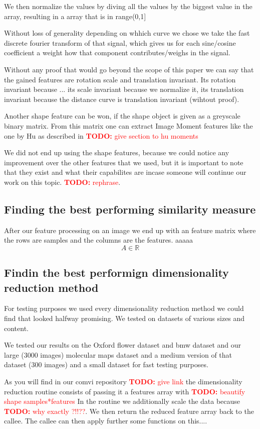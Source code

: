 \documentclass[journal]{vgtc}       %
\newcommand{\todo}[1]{\textcolor{red}{\textbf{TODO:} #1}}
\begin{document}
We then normalize the values by diving all the values by the biggest value in the array, resulting in a array that is in range(0,1]

Without loss of generality depending on whhich curve we chose we take the fast discrete fourier transform of that signal, which gives us for each sine/cosine coefficient a weight how that component contributes/weighs in the signal.

Without any proof that would go beyond the scope of this paper we can say that the gained features are rotation scale and translation invariant. Its rotation invariant because ... its scale invariant because we normalize it, its translation invariant because the distance curve is translation invariant (wihtout proof).

Another shape feature can be won, if the shape object is given as a greyscale binary matrix. From this matrix one can extract Image Moment features like the one by Hu as described in \todo{give section to hu moments}

We did not end up using the shape features, because we could notice any improvement over the other features that we used, but it is important to note that they exist and what their capabilites are incase someone will continue our work on this topic. \todo{rephrase}.



\subsection{Finding the best performing similarity measure}

After our feature processing on an image we end up with an feature matrix where the rows are samples  and the columns are the features. aaaaa \[A \in \mathbb{R}\]


\subsection{Findin the best performign dimensionality reduction method}
For testing purposes we used every dimensionality reduction method we could find that looked halfway promising. We tested on datasets of various sizes and content.

We tested our results on the Oxford flower dataset and bmw dataset and our large (3000 images) molecular maps dataset and a medium version of that dataset (300 images) and a small dataset for fast testing purposes.

As you will find in our comvi repository \todo{give link} the dimensionality reduction routine consists of passing it a features array with \todo{beautify shape samples*features}
In the routine we additionally scale the data because \todo{why exactly ?!!??}.
We then return the reduced feature array back to the callee. The callee can then apply further some functions on this....
\end{document}
